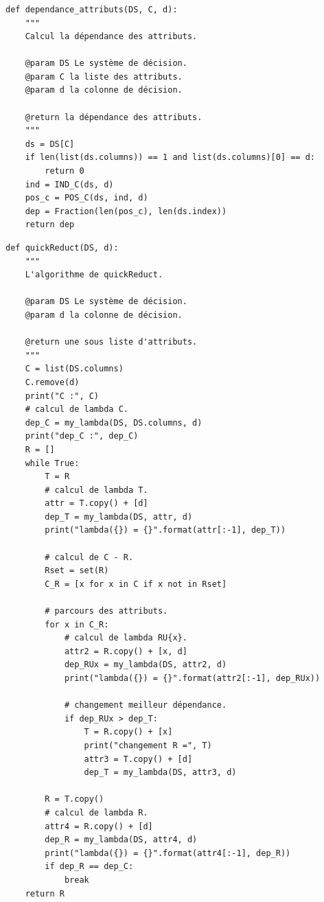 \subsubsection{\quickreduct}
\begin{lstlisting}
def dependance_attributs(DS, C, d):
    """
	Calcul la dépendance des attributs.

	@param DS Le système de décision.
	@param C la liste des attributs.
	@param d la colonne de décision.

	@return la dépendance des attributs.
	"""
	ds = DS[C]
	if len(list(ds.columns)) == 1 and list(ds.columns)[0] == d:
		return 0
	ind = IND_C(ds, d)
	pos_c = POS_C(ds, ind, d)
	dep = Fraction(len(pos_c), len(ds.index))
	return dep
\end{lstlisting}
\begin{lstlisting}
def quickReduct(DS, d):
    """
	L'algorithme de quickReduct.

	@param DS Le système de décision.
	@param d la colonne de décision.

	@return une sous liste d'attributs.
	"""
	C = list(DS.columns)
	C.remove(d)
	print("C :", C)
	# calcul de lambda C.
	dep_C = my_lambda(DS, DS.columns, d)
	print("dep_C :", dep_C)
	R = []
	while True:
		T = R
		# calcul de lambda T.
		attr = T.copy() + [d]
		dep_T = my_lambda(DS, attr, d)
		print("lambda({}) = {}".format(attr[:-1], dep_T))
		
		# calcul de C - R.
		Rset = set(R)
		C_R = [x for x in C if x not in Rset]
		
		# parcours des attributs.
		for x in C_R:
			# calcul de lambda RU{x}.
			attr2 = R.copy() + [x, d]
			dep_RUx = my_lambda(DS, attr2, d)
			print("lambda({}) = {}".format(attr2[:-1], dep_RUx))
			
			# changement meilleur dépendance.
			if dep_RUx > dep_T:
				T = R.copy() + [x]
				print("changement R =", T)
				attr3 = T.copy() + [d]
				dep_T = my_lambda(DS, attr3, d)
		
		R = T.copy()
		# calcul de lambda R.
		attr4 = R.copy() + [d]
		dep_R = my_lambda(DS, attr4, d)
		print("lambda({}) = {}".format(attr4[:-1], dep_R))
		if dep_R == dep_C:
			break
	return R
\end{lstlisting}
